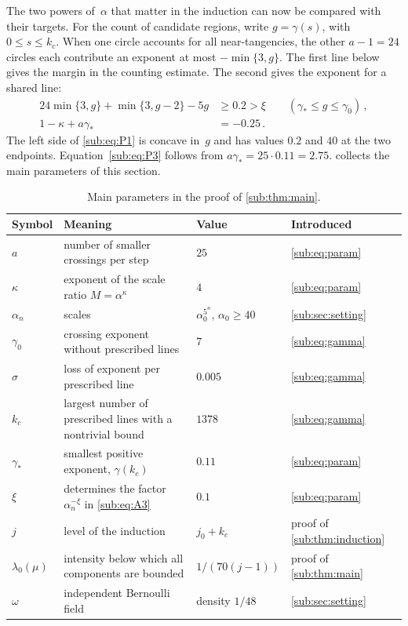 \documentclass[11pt,letterpaper]{article}
\begin{document}
The two powers of~$\alpha$ that matter in the induction can now be compared with their targets. For the count of candidate regions, write $g=\gamma(s)$, with $0\le s\le k_c$. When one circle accounts for all near-tangencies, the other $a-1=24$ circles each contribute an exponent at most $-\min\{3,g\}$. The first line below gives the margin in the counting estimate. The second gives the exponent for a shared line:
\begin{align}
\label{sub:eq:P1}
  24\min\{3,g\}+\min\{3,g-2\}-5g &\ge 0.2>\xi
       \qquad(\gamma_*\le g\le\gamma_0)\,,\\
\label{sub:eq:P3}
  1-\kappa+a\gamma_*&=-0.25\,.
\end{align}
The left side of \eqref{sub:eq:P1} is concave in~$g$ and has values $0.2$ and $40$ at the two endpoints. Equation~\eqref{sub:eq:P3} follows from $a\gamma_*=25\cdot0.11=2.75$.  collects the main parameters of this section.

\begin{table}[!tb]
  \centering
  \footnotesize
  \begin{tabular}{@{}>{\raggedright\arraybackslash}p{1.4cm}>{\raggedright\arraybackslash}p{6.3cm}>{\raggedright\arraybackslash}p{2.3cm}>{\raggedright\arraybackslash}p{3.4cm}@{}}
    \toprule
    Symbol & Meaning & Value & Introduced\\
    \midrule
    $a$ & number of smaller crossings per step & $25$ & \eqref{sub:eq:param}\\
    $\kappa$ & exponent of the scale ratio $M=\alpha^\kappa$ & $4$ & \eqref{sub:eq:param}\\
    $\alpha_n$ & scales & $\alpha_0^{5^n}$, $\alpha_0\ge40$ & \cref{sub:sec:setting}\\
    $\gamma_0$ & crossing exponent without prescribed lines & $7$ & \eqref{sub:eq:gamma}\\
    $\sigma$ & loss of exponent per prescribed line & $0.005$ & \eqref{sub:eq:gamma}\\
    $k_c$ & largest number of prescribed lines with a nontrivial bound & $1378$ & \eqref{sub:eq:gamma}\\
    $\gamma_*$ & smallest positive exponent, $\gamma(k_c)$ & $0.11$ & \eqref{sub:eq:param}\\
    $\xi$ & determines the factor $\alpha_n^{-\xi}$ in \eqref{sub:eq:A3} & $0.1$ & \eqref{sub:eq:param}\\
    $j$ & level of the induction & $j_0+k_c$ & proof of \cref{sub:thm:induction}\\
    $\lambda_0(\mu)$ & intensity below which all components are bounded & $1/(70(j-1))$ & proof of \cref{sub:thm:main}\\
    $\omega$ & independent Bernoulli field & density $1/48$ & \cref{sub:sec:setting}\\
    \bottomrule
  \end{tabular}
  \caption{Main parameters in the proof of \cref{sub:thm:main}.}
  \label{tab:parameters}
\end{table}
\end{document}
